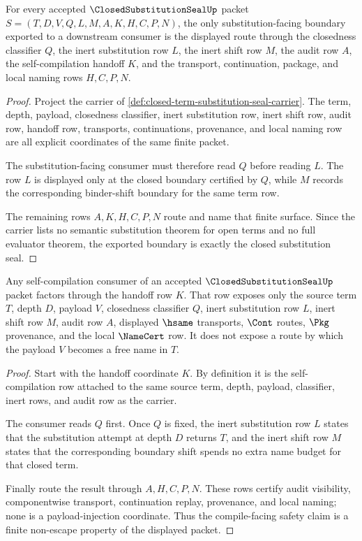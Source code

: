 \begin{theorem}
\label{thm:closed-substitution-seal-boundary}
For every accepted $\ClosedSubstitutionSealUp$ packet $S=(T,D,V,Q,L,M,A,K,H,C,P,N)$, the only substitution-facing boundary exported to a downstream consumer is the displayed route through the closedness classifier $Q$, the inert substitution row $L$, the inert shift row $M$, the audit row $A$, the self-compilation handoff $K$, and the transport, continuation, package, and local naming rows $H,C,P,N$.
\end{theorem}
\begin{proof}
Project the carrier of \autoref{def:closed-term-substitution-seal-carrier}. The term, depth, payload, closedness classifier, inert substitution row, inert shift row, audit row, handoff row, transports, continuations, provenance, and local naming row are all explicit coordinates of the same finite packet.

The substitution-facing consumer must therefore read $Q$ before reading $L$. The row $L$ is displayed only at the closed boundary certified by $Q$, while $M$ records the corresponding binder-shift boundary for the same term row.

The remaining rows $A,K,H,C,P,N$ route and name that finite surface. Since the carrier lists no semantic substitution theorem for open terms and no full evaluator theorem, the exported boundary is exactly the closed substitution seal.
\end{proof}

\begin{theorem}
\label{thm:closed-substitution-compile-safety}
Any self-compilation consumer of an accepted $\ClosedSubstitutionSealUp$ packet factors through the handoff row $K$. That row exposes only the source term $T$, depth $D$, payload $V$, closedness classifier $Q$, inert substitution row $L$, inert shift row $M$, audit row $A$, displayed $\hsame$ transports, $\Cont$ routes, $\Pkg$ provenance, and the local $\NameCert$ row. It does not expose a route by which the payload $V$ becomes a free name in $T$.
\end{theorem}
\begin{proof}
Start with the handoff coordinate $K$. By definition it is the self-compilation row attached to the same source term, depth, payload, classifier, inert rows, and audit row as the carrier.

The consumer reads $Q$ first. Once $Q$ is fixed, the inert substitution row $L$ states that the substitution attempt at depth $D$ returns $T$, and the inert shift row $M$ states that the corresponding boundary shift spends no extra name budget for that closed term.

Finally route the result through $A,H,C,P,N$. These rows certify audit visibility, componentwise transport, continuation replay, provenance, and local naming; none is a payload-injection coordinate. Thus the compile-facing safety claim is a finite non-escape property of the displayed packet.
\end{proof}

